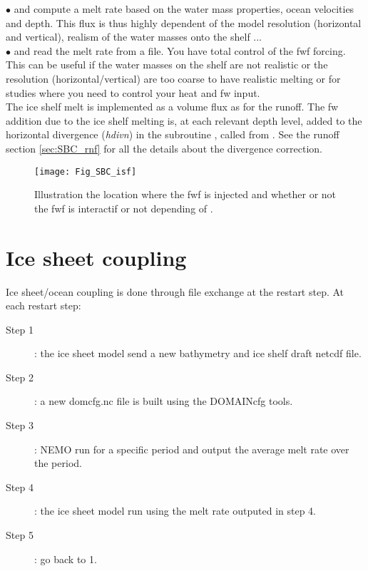 \documentclass[../main/NEMO_manual]{subfiles}
\begin{document}
$\bullet$  and  compute a melt rate based on
the water mass properties, ocean velocities and depth.
This flux is thus highly dependent of the model resolution (horizontal and vertical),
realism of the water masses onto the shelf ...\\

$\bullet$  and  read the melt rate from a file.
You have total control of the fwf forcing.
This can be useful if the water masses on the shelf are not realistic or
the resolution (horizontal/vertical) are too coarse to have realistic melting or
for studies where you need to control your heat and fw input.\\ 

The ice shelf melt is implemented as a volume flux as for the runoff.
The fw addition due to the ice shelf melting is, at each relevant depth level, added to
the horizontal divergence (\textit{hdivn}) in the subroutine , called from .
See the runoff section \autoref{sec:SBC_rnf} for all the details about the divergence correction.\\

\begin{figure}[!t]
  \begin{center}
    \texttt{[image: Fig\_SBC\_isf]}
    \caption{
      \protect\label{fig:SBC_isf}
      Illustration the location where the fwf is injected and whether or not the fwf is interactif or not depending of .
    }
  \end{center}
\end{figure}

\section{Ice sheet coupling}
\label{sec:SBC_iscpl}

Ice sheet/ocean coupling is done through file exchange at the restart step.
At each restart step:
\begin{description}
\item[Step 1]: the ice sheet model send a new bathymetry and ice shelf draft netcdf file.
\item[Step 2]: a new domcfg.nc file is built using the DOMAINcfg tools.
\item[Step 3]: NEMO run for a specific period and output the average melt rate over the period.
\item[Step 4]: the ice sheet model run using the melt rate outputed in step 4.
\item[Step 5]: go back to 1.
\end{description}
\end{document}
